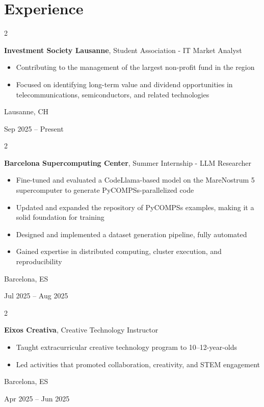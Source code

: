 \documentclass[10pt, letterpaper]{article}
\newenvironment{highlights}{
    \begin{itemize}[
        topsep=0.10 cm,
        parsep=0.10 cm,
        partopsep=0pt,
        itemsep=0pt,
        leftmargin=0.4 cm + 10pt
    ]
}{
    \end{itemize}
} %
\newenvironment{twocolentry}[2][]{
    \onecolentry
    \def\secondColumn{#2}
    \setcolumnwidth{\fill, 4.5 cm}
    \begin{paracol}{2}
}{
    \switchcolumn \raggedleft \secondColumn
    \end{paracol}
    \endonecolentry
} %
\begin{document}
    \section{Experience}

        \begin{twocolentry}{
            Lausanne, CH

            Sep 2025 – Present
        }
            \textbf{Investment Society Lausanne}, Student Association - IT Market Analyst
            \begin{highlights}
                \item Contributing to the management of the largest non-profit fund in the region
                \item Focused on identifying long-term value and dividend opportunities in telecommunications, semiconductors, and related technologies
            \end{highlights}
        \end{twocolentry}

       \begin{twocolentry}{
            Barcelona, ES

            Jul 2025 – Aug 2025
        }
            \textbf{Barcelona Supercomputing Center}, Summer Internship - LLM Researcher
            \begin{highlights}
                \item Fine-tuned and evaluated a CodeLlama-based model on the MareNostrum 5 supercomputer to generate PyCOMPSs-parallelized code
                \item Updated and expanded the repository of PyCOMPSs examples, making it a solid foundation for training
                \item Designed and implemented a dataset generation pipeline, fully automated 
                \item Gained expertise in distributed computing, cluster execution, and reproducibility
            \end{highlights}
        \end{twocolentry}

        \vspace{0.2 cm}

        \begin{twocolentry}{
            Barcelona, ES

            Apr 2025 – Jun 2025
        }
            \textbf{Eixos Creativa}, Creative Technology Instructor
            \begin{highlights}
                \item Taught extracurricular creative technology program to 10–12-year-olds
                \item Led activities that promoted collaboration, creativity, and STEM engagement
            \end{highlights}
        \end{twocolentry}
\end{document}
